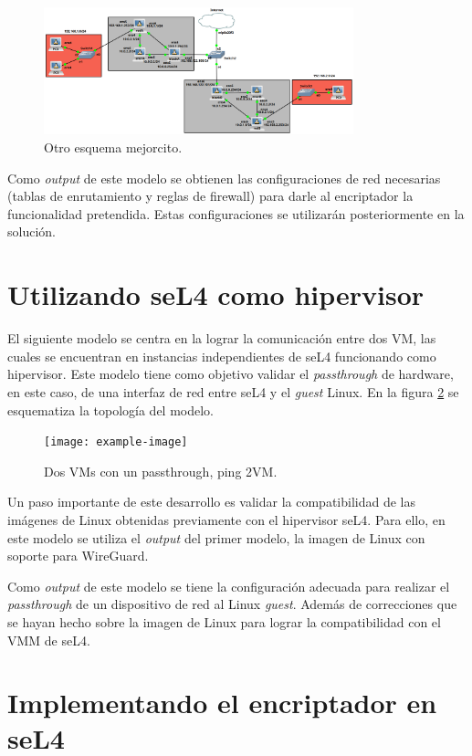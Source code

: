\begin{figure}[h!]
    \centering
    \includegraphics[width=0.8\textwidth]{../figs/gns3_2.png}
    \caption{Otro esquema mejorcito.}
    \label{diag:gns3_2}
\end{figure}

Como \textit{output} de este modelo se obtienen las configuraciones de red necesarias (tablas de enrutamiento y reglas de firewall) para darle al encriptador la funcionalidad pretendida. Estas configuraciones se utilizarán posteriormente en la solución.

\section{Utilizando seL4 como hipervisor}
El siguiente modelo se centra en la lograr la comunicación entre dos VM, las cuales se encuentran en instancias independientes de seL4 funcionando como hipervisor. Este modelo tiene como objetivo validar el \textit{passthrough} de hardware, en este caso, de una interfaz de red entre seL4 y el \textit{guest} Linux. En la figura \ref{diag:esquema_passthrough} se esquematiza la topología del modelo.

\begin{figure}[h!]
    \centering
    \texttt{[image: example-image]}
    \caption{Dos VMs con un passthrough, ping 2VM.}
    \label{diag:esquema_passthrough}
\end{figure}

Un paso importante de este desarrollo es validar la compatibilidad de las imágenes de Linux obtenidas previamente con el hipervisor seL4. Para ello, en este modelo se utiliza el \textit{output} del primer modelo, la imagen de Linux con soporte para WireGuard.

Como \textit{output} de este modelo se tiene la configuración adecuada para realizar el \textit{passthrough} de un dispositivo de red al Linux \textit{guest}. Además de correcciones que se hayan hecho sobre la imagen de Linux para lograr la compatibilidad con el VMM de seL4.

\section{Implementando el encriptador en seL4}


